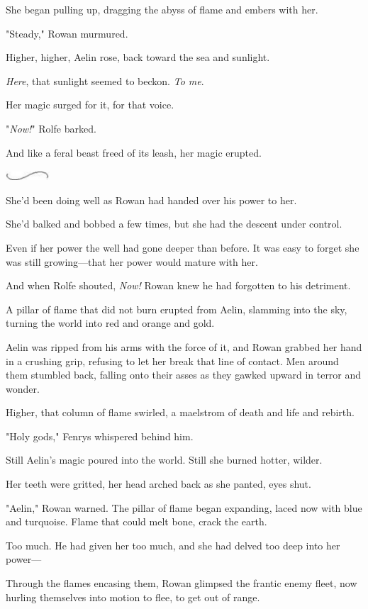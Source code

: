 She began pulling up, dragging the abyss of flame and embers with her.

"Steady," Rowan murmured.

Higher, higher, Aelin rose, back toward the sea and sunlight.

\emph{Here}, that sunlight seemed to beckon. \emph{To me}.

Her magic surged for it, for that voice.

"\emph{Now!}" Rolfe barked.

And like a feral beast freed of its leash, her magic erupted.

\includegraphics[width=0.65in,height=0.13in]{images/seperator}

She'd been doing well as Rowan had handed over his power to her.

She'd balked and bobbed a few times, but  she had the descent under control.

Even if her power  the well had gone deeper than before. It was easy to forget she was still growing---that her power would mature with her.

And when Rolfe shouted, \emph{Now!} Rowan knew he had forgotten to his detriment.

A pillar of flame that did not burn erupted from Aelin, slamming into the sky, turning the world into red and orange and gold.

Aelin was ripped from his arms with the force of it, and Rowan grabbed her hand in a crushing grip, refusing to let her break that line of contact. Men around them stumbled back, falling onto their asses as they gawked upward in terror and wonder.

Higher, that column of flame swirled, a maelstrom of death and life and rebirth.

"Holy gods," Fenrys whispered behind him.

Still Aelin's magic poured into the world. Still she burned hotter, wilder.

Her teeth were gritted, her head arched back as she panted, eyes shut.

"Aelin," Rowan warned. The pillar of flame began expanding, laced now with blue and turquoise. Flame that could melt bone, crack the earth.

Too much. He had given her too much, and she had delved too deep into her power---

Through the flames encasing them, Rowan glimpsed the frantic enemy fleet, now hurling themselves into motion to flee, to get out of range.

